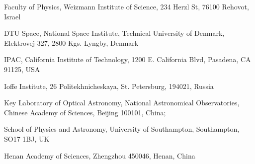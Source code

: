 \documentclass{nature_plusfigure}
\begin{document}
\begin{small}
\begin{affiliations}
\item Faculty of Physics, Weizmann Institute of Science, 234 Herzl St, 76100 Rehovot, Israel
\item DTU Space, National Space Institute, Technical University of Denmark, Elektrovej 327, 2800 Kgs. Lyngby, Denmark
\item IPAC, California Institute of Technology, 1200 E. California Blvd, Pasadena, CA 91125, USA
\item Ioffe Institute, 26 Politekhnicheskaya, St. Petersburg, 194021, Russia
\item Key Laboratory of Optical Astronomy, National Astronomical Observatories, Chinese Academy of Sciences, Beĳing 100101, China; 
\item School of Physics and Astronomy, University of Southampton, Southampton, SO17 1BJ, UK
\item Henan Academy of Sciences, Zhengzhou 450046, Henan, China

\end{affiliations}
\end{small}
\end{document}
